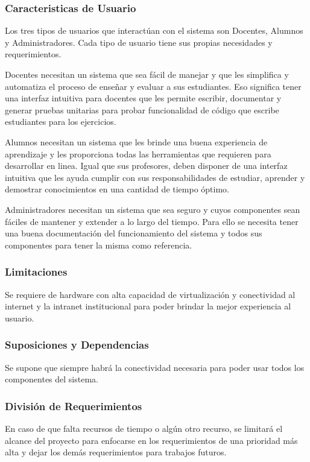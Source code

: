 \subsubsection{Caracteristicas de Usuario}
Los tres tipos de usuarios que interactúan con el sistema son Docentes, Alumnos y Administradores. Cada tipo de usuario tiene sus propias necesidades y requerimientos.

    
Docentes necesitan un sistema que sea fácil de manejar y que les simplifica y automatiza el proceso de enseñar y evaluar a sus estudiantes. Eso significa tener una interfaz intuitiva para docentes que les permite escribir, documentar y generar pruebas unitarias para probar funcionalidad de código que escribe estudiantes para los ejercicios.

 
Alumnos necesitan un sistema que les brinde una buena experiencia de aprendizaje y les proporciona todas las herramientas que requieren para desarrollar en linea. Igual que sus profesores, deben disponer de una interfaz intuitiva que les ayuda cumplir con sus responsabilidades de estudiar, aprender y demostrar conocimientos en una cantidad de tiempo óptimo.

Administradores necesitan un sistema que sea seguro y cuyos componentes sean fáciles de mantener y extender a lo largo del tiempo. Para ello se necesita tener una buena documentación del funcionamiento del sistema y todos sus componentes para tener la misma como referencia.

\subsubsection{Limitaciones}
Se requiere de hardware con alta capacidad de virtualización y conectividad al internet y la intranet institucional para poder brindar la mejor experiencia al usuario.

\subsubsection{Suposiciones y Dependencias}
Se supone que siempre habrá la conectividad necesaria para poder usar todos los componentes del sistema.

\subsubsection{División de Requerimientos}
En caso de que falta recursos de tiempo o algún otro recurso, se limitará el alcance del proyecto para enfocarse en los requerimientos de una prioridad más alta y dejar los demás requerimientos para trabajos futuros.

